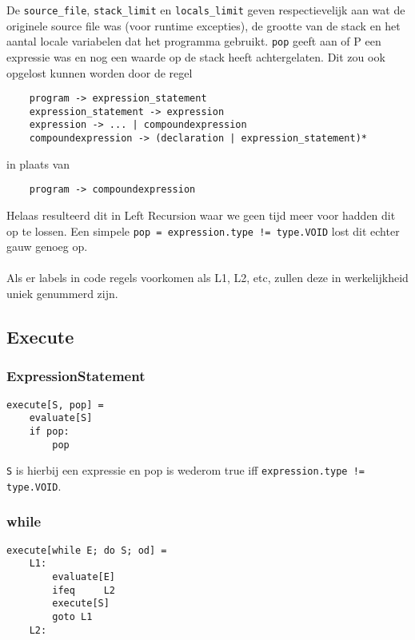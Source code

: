 \documentclass[]{article}
\begin{document}
De \texttt{source\_file}, \texttt{stack\_limit} en \texttt{locals\_limit} geven respectievelijk aan wat de originele source file was (voor runtime excepties), de grootte van de stack en het aantal locale variabelen dat het programma gebruikt. \texttt{pop} geeft aan of P een expressie was en nog een waarde op de stack heeft achtergelaten. Dit zou ook opgelost kunnen worden door de regel

\begin{verbatim}
    program -> expression_statement
    expression_statement -> expression
    expression -> ... | compoundexpression
    compoundexpression -> (declaration | expression_statement)* 
\end{verbatim}

in plaats van

\begin{verbatim}
    program -> compoundexpression
\end{verbatim}

Helaas resulteerd dit in Left Recursion waar we geen tijd meer voor hadden dit op te lossen. Een simpele \texttt{pop = expression.type != type.VOID} lost dit echter gauw genoeg op.\\
\\
Als er labels in code regels voorkomen als L1, L2, etc, zullen deze in werkelijkheid uniek genummerd zijn.

\subsection{Execute}
\subsubsection{ExpressionStatement}

\begin{verbatim}
execute[S, pop] =
    evaluate[S]
    if pop:
        pop
\end{verbatim}

\texttt{S} is hierbij een expressie en pop is wederom true iff \texttt{expression.type != type.VOID}.

\subsubsection{while}
\begin{verbatim}
execute[while E; do S; od] =
    L1:
        evaluate[E]
        ifeq	 L2	
        execute[S]
        goto L1
    L2:
\end{verbatim}
\end{document}
